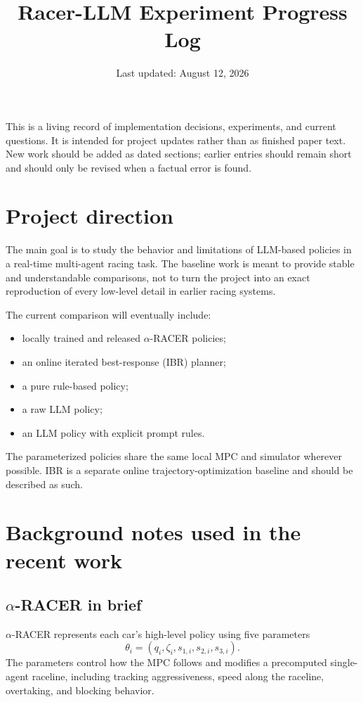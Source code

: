 \documentclass[11pt]{article}
\title{Racer-LLM Experiment Progress Log}
\author{}
\date{Last updated: August 12, 2026}
\begin{document}
\maketitle

\noindent
This is a living record of implementation decisions, experiments, and current
questions. It is intended for project updates rather than as finished paper
text. New work should be added as dated sections; earlier entries should remain
short and should only be revised when a factual error is found.

\section{Project direction}

The main goal is to study the behavior and limitations of LLM-based policies in
a real-time multi-agent racing task. The baseline work is meant to provide
stable and understandable comparisons, not to turn the project into an exact
reproduction of every low-level detail in earlier racing systems.

The current comparison will eventually include:
\begin{itemize}
  \item locally trained and released $\alpha$-RACER policies;
  \item an online iterated best-response (IBR) planner;
  \item a pure rule-based policy;
  \item a raw LLM policy;
  \item an LLM policy with explicit prompt rules.
\end{itemize}

The parameterized policies share the same local MPC and simulator wherever
possible. IBR is a separate online trajectory-optimization baseline and should
be described as such.

\section{Background notes used in the recent work}

\subsection{$\alpha$-RACER in brief}

$\alpha$-RACER represents each car's high-level policy using five parameters
\[
  \theta_i=(q_i,\zeta_i,s_{1,i},s_{2,i},s_{3,i}).
\]
The parameters control how the MPC follows and modifies a precomputed
single-agent raceline, including tracking aggressiveness, speed along the
raceline, overtaking, and blocking behavior.
\end{document}
